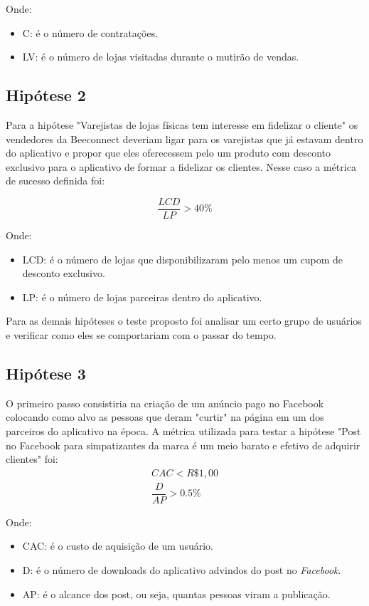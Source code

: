 Onde: 
\begin{itemize}
\item C: é o número de contratações.
\item LV: é o número de lojas visitadas durante o mutirão de vendas.
\end{itemize}

\subsection{Hipótese 2}
\label{cha:hip_2}
Para a hipótese "Varejistas de lojas físicas tem interesse em fidelizar o cliente" os vendedores da Beeconnect deveriam ligar para os varejistas que já estavam dentro do aplicativo e propor que eles oferecessem pelo um produto com desconto exclusivo para o aplicativo de formar a fidelizar os clientes. Nesse caso a métrica de sucesso definida foi:

\[\dfrac{LCD}{LP} > 40\%\]

Onde: 
\begin{itemize}
\item LCD: é o número de lojas que disponibilizaram pelo menos um cupom de desconto exclusivo.
\item LP: é o número de lojas parceiras dentro do aplicativo.
\end{itemize}

Para as demais hipóteses o teste proposto foi analisar um certo grupo de usuários e verificar como eles se comportariam com o passar do tempo. 

\subsection{Hipótese 3}
\label{cha:hip_3}
O primeiro passo consistiria na criação de um anúncio pago no Facebook colocando como alvo as pessoas que deram "curtir" na página em um dos parceiros do aplicativo na época. A métrica utilizada para testar a hipótese "Post no Facebook para simpatizantes da marca é um meio barato e efetivo de adquirir clientes" foi:
\begin{align*} 
CAC < R\$1,00 \\
\dfrac{D}{AP} > 0.5\%
\end{align*}

Onde: 
\begin{itemize}
\item CAC: é o custo de aquisição de um usuário.
\item D: é o número de downloads do aplicativo advindos do post no \textit{Facebook}.
\item AP: é o alcance dos post, ou seja, quantas pessoas viram a publicação.
\end{itemize}

